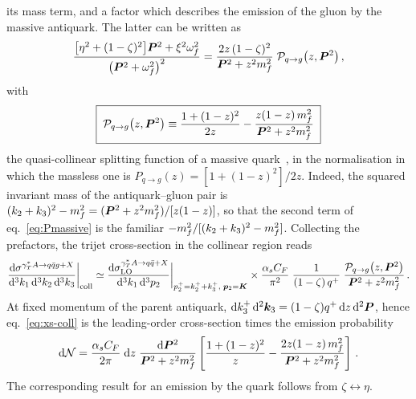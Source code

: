 its mass term, and a factor which describes the emission of the gluon by the massive antiquark. The
latter can be written as
\begin{equation}
\frac{\big[\eta^2+(1-\zeta)^2\big]\bm{P}^2+\xi^2\omega_f^2}{\big(\bm{P}^2+\omega_f^2\big)^2}
=\frac{2z\,(1-\zeta)^2}{\bm{P}^2+z^2m_f^2}\;\mathcal{P}_{q\to g}\big(z,\bm{P}^2\big)\,,
\end{equation}
with
\begin{equation}
\boxed{\;\mathcal{P}_{q\to g}\big(z,\bm{P}^2\big)\equiv\frac{1+(1-z)^2}{2z}-\frac{z(1-z)\,m_f^2}{\bm{P}^2+z^2m_f^2}\;}
\label{eq:Pmassive}
\end{equation}
the quasi-collinear splitting function of a massive quark~\cite{Catani:2000ef}, in the normalisation in
which the massless one is $P_{q\to g}(z)=[1+(1-z)^2]/2z$. Indeed, the squared invariant mass of the
antiquark--gluon pair is $(k_2+k_3)^2-m_f^2=(\bm{P}^2+z^2m_f^2)/[z(1-z)]$, so that the second term of
eq.~\eqref{eq:Pmassive} is the familiar $-m_f^2/[(k_2+k_3)^2-m_f^2]$. Collecting the prefactors, the
trijet cross-section in the collinear region reads
\begin{equation}
\frac{{\rm d}\sigma^{\gamma^{*}_{T} A\to q\bar q g+X}}{{\rm d}^3k_1\,{\rm d}^3k_2\,{\rm d}^3k_3}\bigg|_{\rm coll}\simeq
\frac{{\rm d}\sigma^{\gamma^{*}_{T} A\to q\bar q+X}_{\rm LO}}{{\rm d}^3k_1\,{\rm d}^3p_2}\bigg|_{p_2^+=k_2^++k_3^+,\;\bm{p}_2=\bm{K}}\times
\frac{\alpha_sC_F}{\pi^2}\;\frac{1}{(1-\zeta)\,q^+}\;\frac{\mathcal{P}_{q\to g}\big(z,\bm{P}^2\big)}{\bm{P}^2+z^2m_f^2}\,.
\label{eq:xs-coll}
\end{equation}
At fixed momentum of the parent antiquark, ${\rm d} k_3^+\,{\rm d}^2\bm{k}_3=(1-\zeta)q^+\,{\rm d} z\,{\rm d}^2\bm{P}$, hence
eq.~\eqref{eq:xs-coll} is the leading-order cross-section times the emission probability
\begin{equation}
{\rm d}\mathcal{N}=\frac{\alpha_sC_F}{2\pi}\;{\rm d} z\;\frac{{\rm d}\bm{P}^2}{\bm{P}^2+z^2m_f^2}
\left[\frac{1+(1-z)^2}{z}-\frac{2z(1-z)\,m_f^2}{\bm{P}^2+z^2m_f^2}\right]\,.
\label{eq:dN}
\end{equation}
The corresponding result for an emission by the quark follows from $\zeta\leftrightarrow\eta$.

